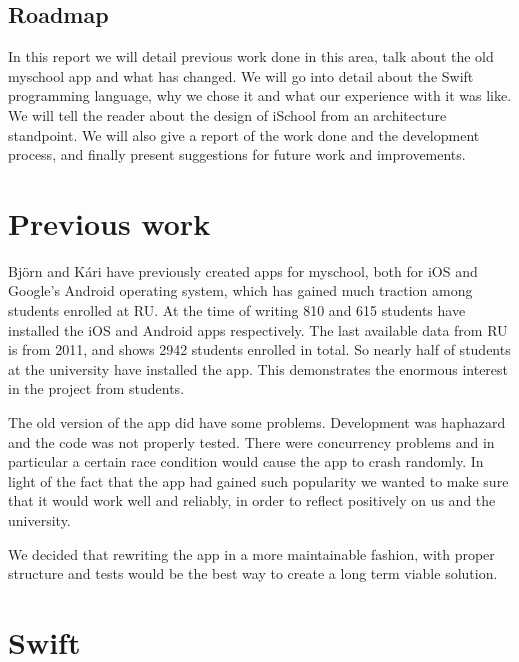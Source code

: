 \documentclass[DIV=calc, paper=a4, fontsize=11pt, twocolumn]{scrartcl}	 %
\begin{document}

\subsection*{Roadmap}

In this report we will detail previous work done in this area, talk about the old myschool app
and what has changed. We will go into detail about the Swift programming language, why we chose it
and what our experience with it was like. We will tell the reader about the design of iSchool from
an architecture standpoint. We will also give a report of the work done and the development process,
and finally present suggestions for future work and improvements.



\section*{Previous work}

Björn and Kári have previously created apps for myschool, both for iOS and Google's Android operating
system, which has gained much traction among students enrolled at RU. At the time of writing 810 
and 615 students have installed the iOS and Android apps respectively. The last available data 
from RU is from 2011, and shows 2942 students enrolled in total. So nearly half of students at the 
university have installed the app. This demonstrates the enormous interest in the project from
students.

The old version of the app did have some problems. Development was haphazard and the code was not
properly tested. There were concurrency problems and in particular a certain race condition would
cause the app to crash randomly. In light of the fact that the app had gained such popularity we 
wanted to make sure that it would work well and reliably, in order to reflect positively on us and
the university.

We decided that rewriting the app in a more maintainable fashion, with proper structure and tests
would be the best way to create a long term viable solution.


\section*{Swift}
\end{document}
